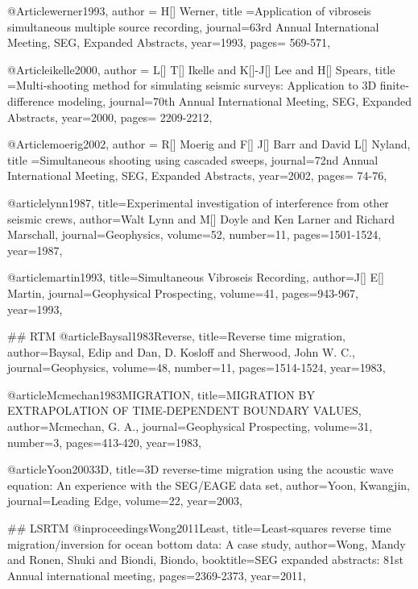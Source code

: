 {@Article{werner1993,
  author = {H[] Werner},
  title ={Application of vibroseis simultaneous multiple source recording},
  journal={63rd Annual International Meeting, SEG, Expanded Abstracts},
  year=1993,
  pages={ 569-571},
}

@Article{ikelle2000,
  author = {L[] T[] Ikelle and K[]-J[] Lee and H[] Spears},
  title ={Multi‐shooting method for simulating seismic surveys: Application to 3D finite‐difference modeling},
  journal={70th Annual International Meeting, SEG, Expanded Abstracts},
  year=2000,
  pages={ 2209-2212},
}

@Article{moerig2002,
  author = {R[] Moerig and F[] J[] Barr and David L[] Nyland},
  title ={Simultaneous shooting using cascaded sweeps},
  journal={72nd Annual International Meeting, SEG, Expanded Abstracts},
  year=2002,
  pages={ 74-76},
}





@article{lynn1987,
  title={Experimental investigation of interference from other seismic crews},
  author={Walt Lynn and M[] Doyle and Ken Larner and Richard Marschall},
  journal={Geophysics},
  volume={52},
  number={11},
  pages={1501-1524},
  year={1987},
}


@article{martin1993,
  title={Simultaneous Vibroseis Recording},
  author={J[] E[] Martin},
  journal={Geophysical Prospecting},
  volume={41},
  pages={943-967},
  year={1993},
}


## RTM
@article{Baysal1983Reverse,
  title={Reverse time migration},
  author={Baysal, Edip and Dan, D. Kosloff and Sherwood, John W. C.},
  journal={Geophysics},
  volume={48},
  number={11},
  pages={1514-1524},
  year={1983},
}

@article{Mcmechan1983MIGRATION,
  title={MIGRATION BY EXTRAPOLATION OF TIME‐DEPENDENT BOUNDARY VALUES},
  author={Mcmechan, G. A.},
  journal={Geophysical Prospecting},
  volume={31},
  number={3},
  pages={413-420},
  year={1983},
}

@article{Yoon20033D,
  title={3{D} reverse-time migration using the acoustic wave equation: An experience with the SEG/EAGE data set},
  author={Yoon, Kwangjin},
  journal={Leading Edge},
  volume={22},
  year={2003},
}

## LSRTM
@inproceedings{Wong2011Least,
  title={Least‐squares reverse time migration/inversion for ocean bottom data: A case study},
  author={Wong, Mandy and Ronen, Shuki and Biondi, Biondo},
  booktitle={SEG expanded abstracts: 81st Annual international meeting},
  pages={2369-2373},
  year={2011},
}

}
